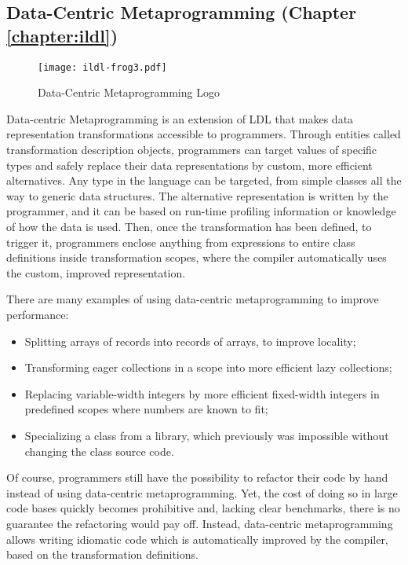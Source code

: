 \subsection{Data-Centric Metaprogramming (Chapter \ref{chapter:ildl})}

\begin{wrapfigure}{r}{40mm}
  \centering
  \vspace{-2em}
  \texttt{[image: ildl-frog3.pdf]}
  \vspace{-1em}
  \caption{Data-Centric Metaprogramming Logo}
  \vspace{-2em}
\end{wrapfigure}


Data-centric Metaprogramming is an extension of LDL that makes data representation transformations accessible to programmers. Through entities called transformation description objects, programmers can target values of specific types and safely replace their data representations by custom, more efficient alternatives. Any type in the language can be targeted, from simple classes all the way to generic data structures. The alternative representation is written by the programmer, and it can be based on run-time profiling information or knowledge of how the data is used. Then, once the transformation has been defined, to trigger it,  programmers enclose anything from expressions to entire class definitions inside transformation scopes, where the compiler automatically uses the custom, improved representation.

There are many examples of using data-centric metaprogramming to improve performance:
\begin{itemize}
  \item Splitting arrays of records into records of arrays, to improve locality;
  \item Transforming eager collections in a scope into more efficient lazy collections;
  \item Replacing variable-width integers by more efficient fixed-width integers in predefined scopes where numbers are known to fit;
  \item Specializing a class from a library, which previously was impossible without changing the class source code.
\end{itemize}

Of course, programmers still have the possibility to refactor their code by hand instead of using data-centric metaprogramming. Yet, the cost of doing so in large code bases quickly becomes prohibitive and, lacking clear benchmarks, there is no guarantee the refactoring would pay off. Instead, data-centric metaprogramming allows writing idiomatic code which is automatically improved by the compiler, based on the transformation definitions.

